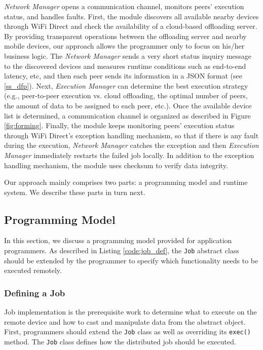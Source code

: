 \documentclass{sig-alternate}
\begin{document}
\emph{Network Manager} opens a communication channel, monitors peers' execution status, and handles faults. First, the module discovers all available nearby devices through WiFi Direct and check the availability of a cloud-based offloading server. By providing transparent operations between the offloading server and nearby mobile devices, our approach allows the programmer only to focus on his/her business logic. The \emph{Network Manager} sends a very short status inquiry message to the discovered devices and measures runtime conditions such as end-to-end latency, etc, and then each peer sends its information in a JSON format (see \ref{ss_dfp}). Next, \emph{Execution Manager} can determine the best execution strategy (e.g., peer-to-peer execution vs. cloud offloading, the optimal number of peers, the amount of data to be assigned to each peer, etc.). Once the available device list is determined, a communication channel is organized as described in Figure \ref{fig:forming}. Finally, the module keeps monitoring peers' execution status through WiFi Direct's exception handling mechanism, so that if there is any fault during the execution, \emph{Network Manager} catches the exception and then \emph{Execution Manager} immediately restarts the failed job locally. In addition to the exception handling mechanism, the module uses checksum to verify data integrity.

Our approach mainly comprises two parts: a programming model and runtime system. We describe these parts in turn next.

\subsection{Programming Model} \label{prog_model}
In this section, we discuss a programming model provided for application programmers. As described in Listing \ref{code:job_def}, the \texttt{Job} abstract class should be extended by the programmer to specify which functionality needs to be executed remotely. 

\subsubsection{Defining a Job}
Job implementation is the prerequisite work to determine what to execute on the remote device and how to cast and manipulate data from the abstract object. First, programmers should extend the \texttt{Job} class as well as overriding its \texttt{exec()} method. The \texttt{Job} class defines how the distributed job should be executed. 
\end{document}
